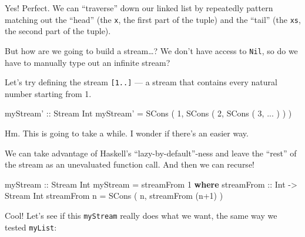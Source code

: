 \documentclass[]{article}
\newenvironment{Shaded}{}{}
\newcommand{\KeywordTok}[1]{\textcolor[rgb]{0.00,0.44,0.13}{\textbf{{#1}}}}
\newcommand{\DataTypeTok}[1]{\textcolor[rgb]{0.56,0.13,0.00}{{#1}}}
\newcommand{\DecValTok}[1]{\textcolor[rgb]{0.25,0.63,0.44}{{#1}}}
\newcommand{\OtherTok}[1]{\textcolor[rgb]{0.00,0.44,0.13}{{#1}}}
\newcommand{\FunctionTok}[1]{\textcolor[rgb]{0.02,0.16,0.49}{{#1}}}
\newcommand{\NormalTok}[1]{{#1}}
\begin{document}
Yes! Perfect. We can ``traverse'' down our linked list by repeatedly pattern matching out the
``head'' (the \texttt{x}, the first part of the tuple) and the ``tail'' (the \texttt{xs}, the second
part of the tuple).

But how are we going to build a stream\ldots{}? We don't have access to \texttt{Nil}, so do we have
to manually type out an infinite stream?

Let's try defining the stream \texttt{{[}1..{]}} --- a stream that contains every natural number
starting from 1.

\begin{Shaded}
\begin{Highlighting}[]
\OtherTok{myStream' ::} \DataTypeTok{Stream} \DataTypeTok{Int}
\NormalTok{myStream' }\FunctionTok{=} \DataTypeTok{SCons} \NormalTok{( }\DecValTok{1}\NormalTok{, }\DataTypeTok{SCons} \NormalTok{( }\DecValTok{2}\NormalTok{, }\DataTypeTok{SCons} \NormalTok{( }\DecValTok{3}\NormalTok{, }\FunctionTok{...} \NormalTok{) ) )}
\end{Highlighting}
\end{Shaded}

Hm. This is going to take a while. I wonder if there's an easier way.

We can take advantage of Haskell's ``lazy-by-default''-ness and leave the ``rest'' of the stream as
an unevaluated function call. And then we can recurse!

\begin{Shaded}
\begin{Highlighting}[]
\OtherTok{myStream ::} \DataTypeTok{Stream} \DataTypeTok{Int}
\NormalTok{myStream }\FunctionTok{=} \NormalTok{streamFrom }\DecValTok{1}
  \KeywordTok{where}
\OtherTok{    streamFrom ::} \DataTypeTok{Int} \OtherTok{->} \DataTypeTok{Stream} \DataTypeTok{Int}
    \NormalTok{streamFrom n }\FunctionTok{=} \DataTypeTok{SCons} \NormalTok{( n, streamFrom (n}\FunctionTok{+}\DecValTok{1}\NormalTok{) )}
\end{Highlighting}
\end{Shaded}

Cool! Let's see if this \texttt{myStream} really does what we want, the same way we tested
\texttt{myList}:
\end{document}
